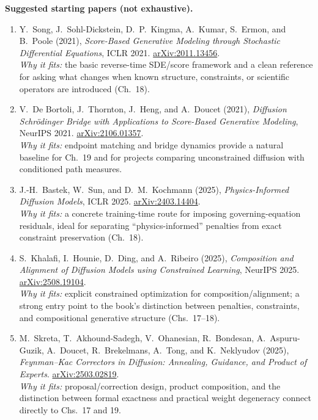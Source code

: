 \documentclass[11pt]{article}
\begin{document}
\textbf{Suggested starting papers (not exhaustive).}
\begin{enumerate}[leftmargin=1.7em,itemsep=5pt]
    \item Y.~Song, J.~Sohl-Dickstein, D.~P.~Kingma, A.~Kumar, S.~Ermon, and B.~Poole (2021), \emph{Score-Based Generative Modeling through Stochastic Differential Equations}, ICLR 2021. \href{https://arxiv.org/abs/2011.13456}{arXiv:2011.13456}.\\
    \textcolor{UAgray}{\emph{Why it fits:} the basic reverse-time SDE/score framework and a clean reference for asking what changes when known structure, constraints, or scientific operators are introduced (Ch.~18).}

    \item V.~De Bortoli, J.~Thornton, J.~Heng, and A.~Doucet (2021), \emph{Diffusion Schr\"odinger Bridge with Applications to Score-Based Generative Modeling}, NeurIPS 2021. \href{https://arxiv.org/abs/2106.01357}{arXiv:2106.01357}.\\
    \textcolor{UAgray}{\emph{Why it fits:} endpoint matching and bridge dynamics provide a natural baseline for Ch.~19 and for projects comparing unconstrained diffusion with conditioned path measures.}

    \item J.-H.~Bastek, W.~Sun, and D.~M.~Kochmann (2025), \emph{Physics-Informed Diffusion Models}, ICLR 2025. \href{https://arxiv.org/abs/2403.14404}{arXiv:2403.14404}.\\
    \textcolor{UAgray}{\emph{Why it fits:} a concrete training-time route for imposing governing-equation residuals, ideal for separating ``physics-informed'' penalties from exact constraint preservation (Ch.~18).}

    \item S.~Khalafi, I.~Hounie, D.~Ding, and A.~Ribeiro (2025), \emph{Composition and Alignment of Diffusion Models using Constrained Learning}, NeurIPS 2025. \href{https://arxiv.org/abs/2508.19104}{arXiv:2508.19104}.\\
    \textcolor{UAgray}{\emph{Why it fits:} explicit constrained optimization for composition/alignment; a strong entry point to the book's distinction between penalties, constraints, and compositional generative structure (Chs.~17--18).}

    \item M.~Skreta, T.~Akhound-Sadegh, V.~Ohanesian, R.~Bondesan, A.~Aspuru-Guzik, A.~Doucet, R.~Brekelmans, A.~Tong, and K.~Neklyudov (2025), \emph{Feynman--Kac Correctors in Diffusion: Annealing, Guidance, and Product of Experts}. \href{https://arxiv.org/abs/2503.02819}{arXiv:2503.02819}.\\
    \textcolor{UAgray}{\emph{Why it fits:} proposal/correction design, product composition, and the distinction between formal exactness and practical weight degeneracy connect directly to Chs.~17 and 19.}


\end{enumerate}
\end{document}
